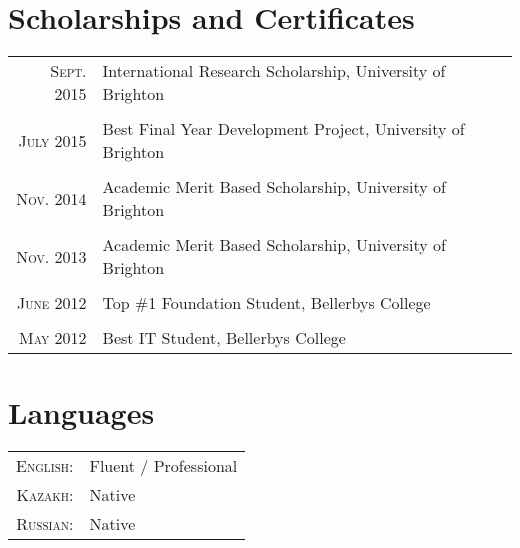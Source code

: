 \documentclass[a4paper,10pt]{article} %
\begin{document}

\section{Scholarships and Certificates}

\begin{tabular}{rl}
\textsc{Sept.} 2015 & International Research Scholarship, University of Brighton \normalsize\\
\\
\textsc{July} 2015 & Best Final Year Development Project, University of Brighton \\
\\
\textsc{Nov.} 2014 & Academic Merit Based Scholarship, University of Brighton \\
\\
\textsc{Nov.} 2013 & Academic Merit Based Scholarship, University of Brighton \\
\\
\textsc{June} 2012 & Top \#1 Foundation Student, Bellerbys College \\
\\
\textsc{May} 2012 & Best IT Student, Bellerbys College \\
\end{tabular}


\section{Languages}

\begin{tabular}{rl}
\textsc{English:} & Fluent / Professional\\

\textsc{Kazakh:} & Native\\

\textsc{Russian:} & Native\\
\end{tabular}
\bigskip

\end{document}
